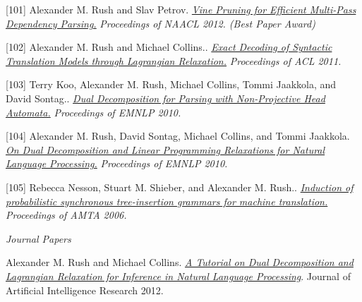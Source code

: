 \documentclass[10pt]{article}
\begin{document}
[101] \ind Alexander M. Rush and Slav Petrov. \emph{\href{ http://people.csail.mit.edu/srush/vine-paper.pdf }{ Vine Pruning for Efficient Multi-Pass Dependency Parsing.} }\emph{ Proceedings of NAACL 2012. (Best Paper Award) }

[102] \ind Alexander M. Rush and Michael Collins.. \emph{\href{ http://people.csail.mit.edu/srush/exdecmt.pdf }{ Exact Decoding of Syntactic Translation Models through Lagrangian Relaxation.} }\emph{ Proceedings of ACL 2011. }

[103] \ind Terry Koo, Alexander M. Rush, Michael Collins, Tommi Jaakkola, and David Sontag.. \emph{\href{ http://people.csail.mit.edu/maestro/papers/koo10mstdd.pdf }{ Dual Decomposition for Parsing with Non-Projective Head Automata.} }\emph{ Proceedings of EMNLP 2010. }

[104] \ind Alexander M. Rush, David Sontag, Michael Collins, and Tommi Jaakkola. \emph{\href{ http://people.csail.mit.edu/dsontag/papers/RusSonColJaa_emnlp10.pdf }{ On Dual Decomposition and Linear Programming Relaxations for Natural Language Processing.} }\emph{ Proceedings of EMNLP 2010. }

[105] \ind Rebecca Nesson, Stuart M. Shieber, and Alexander M. Rush.. \emph{\href{ http://www.eecs.harvard.edu/~shieber/Biblio/Papers/Nesson-2006-IPS.pdf }{ Induction of probabilistic synchronous tree-insertion grammars for machine translation.} }\emph{ Proceedings of AMTA 2006. }


\vspace{0.3in}

\noindent\emph{Journal Papers \vspace{0.01in}}

\ind Alexander M. Rush and Michael Collins. \emph{\href{http://www.cs.columbia.edu/~mcollins/acltutorial.pdf}{A Tutorial on Dual Decomposition and Lagrangian Relaxation for Inference in Natural Language Processing}}. Journal of Artificial Intelligence Research 2012.





\end{document}
